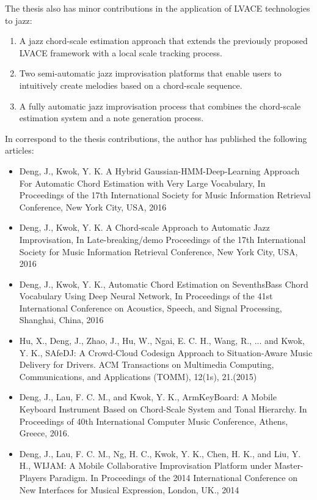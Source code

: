 The thesis also has minor contributions in the application of LVACE technologies to jazz:
\begin{enumerate}
\item A jazz chord-scale estimation approach that extends the previously proposed LVACE framework with a local scale tracking process.
\item Two semi-automatic jazz improvisation platforms that enable users to intuitively create melodies based on a chord-scale sequence.
\item A fully automatic jazz improvisation process that combines the chord-scale estimation system and a note generation process.
\end{enumerate}

In correspond to the thesis contributions, the author has published the following articles:
\begin{itemize}
\item Deng, J., Kwok, Y. K. A Hybrid Gaussian-HMM-Deep-Learning Approach For Automatic Chord Estimation with Very Large Vocabulary, In Proceedings of the 17th International Society for Music Information Retrieval Conference, New York City, USA, 2016
\item Deng, J., Kwok, Y. K. A Chord-scale Approach to Automatic Jazz Improvisation, In Late-breaking/demo Proceedings of the 17th International Society for Music Information Retrieval Conference, New York City, USA, 2016
\item Deng, J., Kwok, Y. K., Automatic Chord Estimation on SeventhsBass Chord Vocabulary Using Deep Neural Network, In Proceedings of the 41st International Conference on Acoustics, Speech, and Signal Processing, Shanghai, China, 2016
\item Hu, X., Deng, J., Zhao, J., Hu, W., Ngai, E. C. H., Wang, R., ... and Kwok, Y. K., SAfeDJ: A Crowd-Cloud Codesign Approach to Situation-Aware Music Delivery for Drivers. ACM Transactions on Multimedia Computing, Communications, and Applications (TOMM), 12(1s), 21.(2015)
\item Deng, J., Lau, F. C. M., and Kwok, Y. K., ArmKeyBoard: A Mobile Keyboard Instrument Based on Chord-Scale System and Tonal Hierarchy. In Proceedings of 40th International Computer Music Conference, Athens, Greece, 2016.
\item Deng, J., Lau, F. C. M., Ng, H. C., Kwok, Y. K., Chen, H. K., and Liu, Y. H., WIJAM: A Mobile Collaborative Improvisation Platform under Master-Players Paradigm. In Proceedings of the 2014 International Conference on New Interfaces for Musical Expression, London, UK., 2014
\end{itemize}

